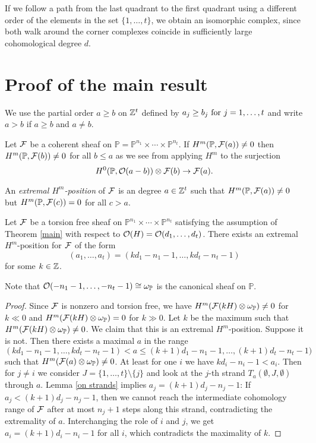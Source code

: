 \documentclass[twoside,12pt, leqno]{article}
\def\o{{\emptyset}}
\def\PP{{\mathbb P}}
\def\Tate#1#2#3#4{{T_#1(#2,#3,#4)}}
\def\PPn{{\PP^{n_1} \times \cdots  \times \PP^{n_t}}}
\begin{document}
If we follow a path from the last quadrant to the first quadrant using a different order of the elements in the set 
$\{1,\ldots,t \}$, we obtain an isomorphic complex, since both walk around the corner complexes coincide
in sufficiently large cohomological degree $d$.

\section{Proof of the main result}

We use the partial order $a \ge b$ on ${\mathbb Z}^t$ defined by $a_j \ge b_j \hbox{ for } j=1,\ldots, t$ and write $a > b$ if $a \ge b$ and $a \not=b$.

Let ${\mathcal F}$ be a coherent sheaf on $\PP=\PPn$.
If $H^m(\PP,\sF(a)) \not=0$ then $H^m(\PP,\sF(b)) \not=0$ for all $b \le a$ as we see from applying $H^m$ to the surjection 
$$ H^0(\PP,\sO(a-b)) \otimes \sF(b) \to \sF(a).$$



 An {\it extremal $H^m$-position} of ${\mathcal F}$ is an degree $a\in {\mathbb Z}^t$ such that
$H^m(\PP,\sF(a)) \not= 0$ but $H^m(\PP,\sF(c))=0$ for all $c > a$.

\begin{proposition}\label{extremal Hm} Let ${\mathcal F}$ be a torsion free sheaf on $\PPn$ satisfying the assumption of 
Theorem \ref{main} with respect to
${\mathcal O}(H) = {\mathcal O}(d_1,\ldots,d_t)$. There exists an extremal $H^m$-position for ${\mathcal F}$ of the form
$$ (a_1,\ldots,a_t)=(kd_1-n_1-1,\ldots,kd_t-n_t-1) $$
for some $k \in {\mathbb Z}$.
\end{proposition}

Note that $\sO(-n_1-1,\ldots,-n_t-1) \cong \omega_\PP$ is the canonical sheaf on $\PP$.

\begin{proof} Since ${\mathcal F}$ is nonzero and torsion free, we have
$H^m(\sF(kH)\tensor \omega_\PP) \not=0$ for $k\ll 0$ and $H^m(\sF(kH) \tensor \omega_\PP) =0$ for $k \gg 0$.
Let $k$ be the maximum such that $H^m(\sF(kH)\tensor \omega_\PP) \not=0$. We claim that this is an extremal $H^m$-position.
Suppose it is not. Then there exists a maximal $a$ in the range
$$(kd_1-n_1-1, \ldots,kd_t-n_t-1) < a \le (k+1)d_1-n_1-1, \ldots,(k+1)d_t-n_t-1)$$
such that $H^m(\sF(a)\tensor \omega_\PP) \not=0$. At least for one $i$ we have $kd_i-n_i-1 < a_i$. Then for $j \not=i$ we consider $J=\{1,\ldots,t\}\setminus \{j\}$ and look at the $j$-th
strand $\Tate a \o J \o $ through $a$.  Lemma \ref{on strands} implies $a_j=(k+1)d_j-n_j-1$: If  $a_j<(k+1)d_j-n_j-1$,
then we cannot reach the intermediate cohomology range of ${\mathcal F}$ after at most $n_j+1$ steps along this strand, contradicting  the extremality of $a$. Interchanging the role of $i$ and $j$, we get
 $a_i=(k+1)d_i-n_i-1$ for all $i$, which contradicts the maximality of $k$.
\end{proof}
\end{document}
